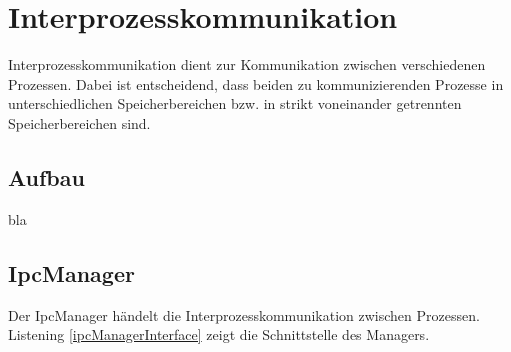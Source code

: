 \section{Interprozesskommunikation}
\label{chapIPC}
Interprozesskommunikation dient zur Kommunikation zwischen verschiedenen Prozessen. Dabei ist entscheidend, dass beiden zu kommunizierenden Prozesse in unterschiedlichen Speicherbereichen bzw. in strikt voneinander getrennten Speicherbereichen sind. 

\subsection{Aufbau}
bla

\subsection{IpcManager}
Der IpcManager händelt die Interprozesskommunikation zwischen Prozessen. Listening \ref{ipcManagerInterface} zeigt die Schnittstelle des Managers.



\pagebreak 